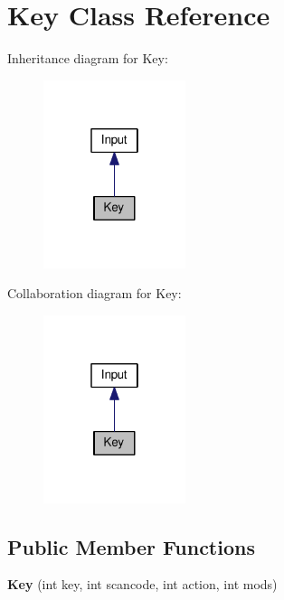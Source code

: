 \hypertarget{classKey}{}\section{Key Class Reference}
\label{classKey}


Inheritance diagram for Key\+:
\nopagebreak
\begin{figure}[H]
\begin{center}
\leavevmode
\includegraphics[width=118pt]{classKey__inherit__graph}
\end{center}
\end{figure}


Collaboration diagram for Key\+:
\nopagebreak
\begin{figure}[H]
\begin{center}
\leavevmode
\includegraphics[width=118pt]{classKey__coll__graph}
\end{center}
\end{figure}
\subsection*{Public Member Functions}
\begin{DoxyCompactItemize}
\item 
\hypertarget{classKey_a21c1c991388635db9b0690de6ff3292a}{}{\bfseries Key} (int key, int scancode, int action, int mods)\label{classKey_a21c1c991388635db9b0690de6ff3292a}

\end{DoxyCompactItemize}
